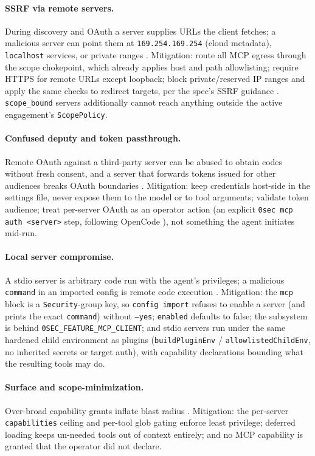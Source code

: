 \documentclass[11pt]{article}
\begin{document}
\paragraph{SSRF via remote servers.} During discovery and OAuth a server
supplies URLs the client fetches; a malicious server can point them at
\texttt{169.254.169.254} (cloud metadata), \texttt{localhost} services, or
private ranges \cite{mcp-security}. Mitigation: route all MCP egress through the
scope chokepoint, which already applies host and path allowlisting; require
HTTPS for remote URLs except loopback; block private/reserved IP ranges and
apply the same checks to redirect targets, per the spec's SSRF guidance
\cite{mcp-security}. \texttt{scope\_bound} servers additionally cannot reach
anything outside the active engagement's \texttt{ScopePolicy}.

\paragraph{Confused deputy and token passthrough.} Remote OAuth against a
third-party server can be abused to obtain codes without fresh consent, and a
server that forwards tokens issued for other audiences breaks OAuth boundaries
\cite{mcp-security}. Mitigation: keep credentials host-side in the settings
file, never expose them to the model or to tool arguments; validate token
audience; treat per-server OAuth as an operator action (an explicit
\texttt{0sec mcp auth <server>} step, following OpenCode \cite{opencode-mcp}),
not something the agent initiates mid-run.

\paragraph{Local server compromise.} A stdio server is arbitrary code run with
the agent's privileges; a malicious \texttt{command} in an imported config is
remote code execution \cite{mcp-security}. Mitigation: the \texttt{mcp} block is
a \texttt{Security}-group key, so \texttt{config import} refuses to enable a
server (and prints the exact \texttt{command}) without \texttt{--yes};
\texttt{enabled} defaults to false; the subsystem is behind
\texttt{0SEC\_FEATURE\_MCP\_CLIENT}; and stdio servers run under the same hardened
child environment as plugins (\texttt{buildPluginEnv} / \texttt{allowlistedChildEnv},
no inherited secrets or target auth), with capability declarations bounding what
the resulting tools may do.

\paragraph{Surface and scope-minimization.} Over-broad capability grants inflate
blast radius \cite{mcp-security}. Mitigation: the per-server \texttt{capabilities}
ceiling and per-tool glob gating enforce least privilege; deferred loading keeps
un-needed tools out of context entirely; and no MCP capability is granted that
the operator did not declare.
\end{document}
